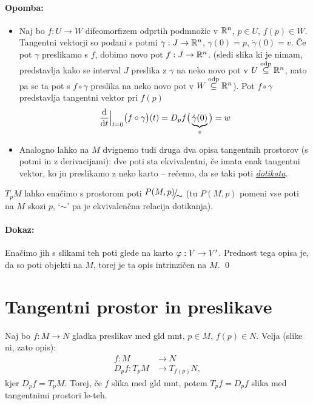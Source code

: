 \paragraph{Opomba:}
\begin{itemize}
	\item{Naj bo $f : U \to W$ difeomorfizem odprtih podmno\v zic v $\mathbb{R}^n$, $p \in U$, $f(p) \in W$. Tangentni vektorji
		so podani s potmi $\gamma : J \to \mathbb{R}^n$, $\gamma (0) = p$, $\dot{\gamma}(0) = v$. \v Ce pot $\gamma$ preslikamo s $f$,
		dobimo novo pot $f : J \to \mathbb{R}^n$. (sledi slika ki je nimam, predstavlja kako se interval $J$ preslika z $\gamma$ na neko novo pot
		v $U \stackrel{\text{odp}}{\subseteq} \mathbb{R}^n$, nato pa se ta pot s $f \circ \gamma$ preslika na neko novo pot v $W \stackrel{\text{odp}}{\subseteq} \mathbb{R}^n$). Pot $f \circ \gamma$
		predstavlja tangentni vektor pri $f(p)$
		\[
			\frac{\text{d}}{\text{d} t}\Big|_{t = 0} \big(f \circ \gamma\big) (t) = D_p f\big(\underbrace{\dot{\gamma}(0)}_v\big) = w
		\]}
	\item{Analogno lahko na $M$ dvignemo tudi druga dva opisa tangentnih prostorov (s potmi in z derivacijami): dve poti sta ekvivalentni,
		\v ce imata enak tangentni vektor, ko ju preslikamo z neko karto -- re\v cemo, da se taki poti \underline{\emph{dotikata}}.}
\end{itemize}

\begin{trditev}
	$T_pM$ lahko ena\v cimo s prostorom poti $\quot{P(M,p)}{\sim}$ \big(tu $P(M,p)$ pomeni vse poti na $M$ skozi $p$, `$\sim$' pa je ekvivalen\v cna
	relacija dotikanja\big).
\end{trditev}

\paragraph{Dokaz:}
Ena\v cimo jih s slikami teh poti glede na karto $\varphi : V \to V'$. Prednost tega opisa je, da so poti objekti na $M$, torej je ta opis
intrinzi\v cen na $M$.
\qed

\section{Tangentni prostor in preslikave}

Naj bo $f : M \to N$ gladka preslikav med gld mnt, $p \in M$, $f(p) \in N$. Velja (slike ni, zato opis):
\begin{align*}
	f : M &\to N \\
	D_pf : T_pM &\to T_{f(p)}N,
\end{align*}
kjer $D_pf = T_pM$. Torej, \v ce $f$ slika med gld mnt, potem $T_pf = D_pf$ slika med tangentnimi prostori le-teh.

